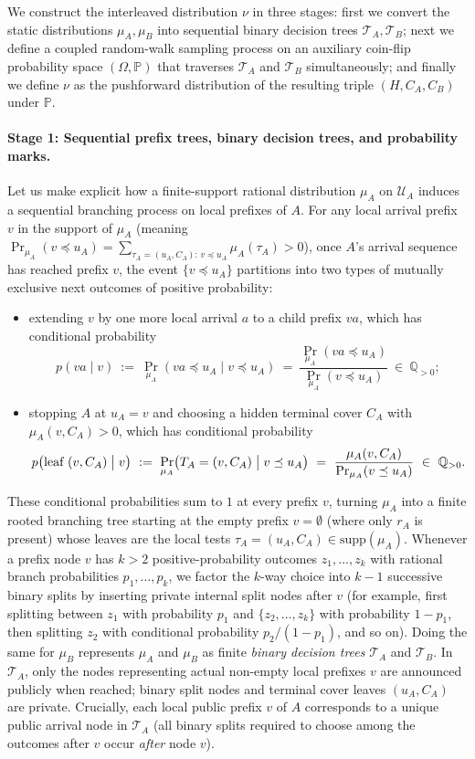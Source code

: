 \documentclass[11pt,letterpaper]{article}
\begin{document}
We construct the interleaved distribution $\nu$ in three stages: first we convert the static distributions $\mu_A,\mu_B$ into sequential binary decision trees $\mathcal T_A,\mathcal T_B$; next we define a coupled random-walk sampling process on an auxiliary coin-flip probability space $(\Omega,\mathbb P)$ that traverses $\mathcal T_A$ and $\mathcal T_B$ simultaneously; and finally we define $\nu$ as the pushforward distribution of the resulting triple $(H,C_A,C_B)$ under $\mathbb P$.

\paragraph{Stage 1: Sequential prefix trees, binary decision trees, and probability marks.}
Let us make explicit how a finite-support rational distribution $\mu_A$ on $\mathcal U_A$ induces a sequential branching process on local prefixes of $A$. For any local arrival prefix $v$ in the support of $\mu_A$ (meaning $\Pr_{\mu_A}(v\preceq u_A) = \sum_{\tau_A=(u_A,C_A):\,v\preceq u_A}\mu_A(\tau_A) > 0$), once $A$'s arrival sequence has reached prefix $v$, the event $\{v\preceq u_A\}$ partitions into two types of mutually exclusive next outcomes of positive probability:
\begin{itemize}
\item extending $v$ by one more local arrival $a$ to a child prefix $va$, which has conditional probability
\[
  p(va\mid v)\ :=\ \Pr_{\mu_A}(va\preceq u_A\mid v\preceq u_A)\ =\ \frac{\Pr_{\mu_A}(va\preceq u_A)}{\Pr_{\mu_A}(v\preceq u_A)}\ \in\ \mathbb Q_{>0};
\]
\item stopping $A$ at $u_A=v$ and choosing a hidden terminal cover $C_A$ with $\mu_A(v,C_A)>0$, which has conditional probability
\[
  p\bigl(\text{leaf }(v,C_A)\bigm| v\bigr)\ :=\ \Pr_{\mu_A}\bigl(T_A=(v,C_A)\bigm| v\preceq u_A\bigr)\ =\ \frac{\mu_A(v,C_A)}{\Pr_{\mu_A}(v\preceq u_A)}\ \in\ \mathbb Q_{>0}.
\]
\end{itemize}
These conditional probabilities sum to $1$ at every prefix $v$, turning $\mu_A$ into a finite rooted branching tree starting at the empty prefix $v=\emptyset$ (where only $r_A$ is present) whose leaves are the local tests $\tau_A=(u_A,C_A)\in\mathrm{supp}(\mu_A)$. Whenever a prefix node $v$ has $k>2$ positive-probability outcomes $z_1,\ldots,z_k$ with rational branch probabilities $p_1,\ldots,p_k$, we factor the $k$-way choice into $k-1$ successive binary splits by inserting private internal split nodes after $v$ (for example, first splitting between $z_1$ with probability $p_1$ and $\{z_2,\ldots,z_k\}$ with probability $1-p_1$, then splitting $z_2$ with conditional probability $p_2/(1-p_1)$, and so on). Doing the same for $\mu_B$ represents $\mu_A$ and $\mu_B$ as finite \emph{binary decision trees} $\mathcal T_A$ and $\mathcal T_B$. In $\mathcal T_A$, only the nodes representing actual non-empty local prefixes $v$ are announced publicly when reached; binary split nodes and terminal cover leaves $(u_A,C_A)$ are private. Crucially, each local public prefix $v$ of $A$ corresponds to a unique public arrival node in $\mathcal T_A$ (all binary splits required to choose among the outcomes after $v$ occur \emph{after} node $v$).
\end{document}
